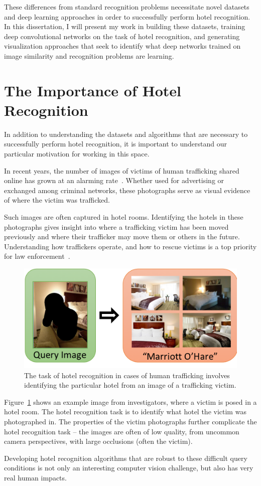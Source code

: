 These differences from standard recognition problems necessitate novel datasets and deep learning approaches in order to successfully perform hotel recognition. In this dissertation, I will present my work in building these datasets, training deep convolutional networks on the task of hotel recognition, and generating visualization approaches that seek to identify what deep networks trained on image similarity and recognition problems are learning.

\section{The Importance of Hotel Recognition}
In addition to understanding the datasets and algorithms that are necessary to successfully perform hotel recognition, it is important to understand our particular motivation for working in this space.

In recent years, the number of images of victims of human trafficking shared online has grown at an alarming rate~\cite{bouche2015report,ncmecAmicusBrief}. Whether used for advertising or exchanged among criminal networks, these photographs serve as visual evidence of where the victim was trafficked.

Such images are often captured in hotel rooms. Identifying the hotels in these photographs gives insight into where a trafficking victim has been moved previously and where their trafficker may move them or others in the future. Understanding how traffickers operate, and how to rescue victims is a top priority for law enforcement~\cite{nationalStrategy}.

\begin{figure}
    \centering
    \includegraphics[width=.7\columnwidth]{figures/chapter1/victimQuery_to_hotel.png}
    \caption{The task of hotel recognition in cases of human trafficking involves identifying the particular hotel from an image of a trafficking victim.}
    \label{fig:victimQuery_to_hotel}
\end{figure}

Figure~\ref{fig:victimQuery_to_hotel} shows an example image from investigators, where a victim is posed in a hotel room. The hotel recognition task is to identify what hotel the victim was photographed in. The properties of the victim photographs further complicate the hotel recognition task -- the images are often of low quality, from uncommon camera perspectives, with large occlusions (often the victim).

Developing hotel recognition algorithms that are robust to these difficult query conditions is not only an interesting computer vision challenge, but also has very real human impacts.
